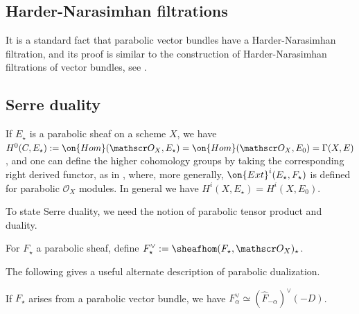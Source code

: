 \subsection{Harder-Narasimhan filtrations}
\label{subsubsection:harder-narasimhan-parabolic}
It is a standard fact that parabolic vector bundles have a Harder-Narasimhan
filtration, and its proof is similar to the construction of Harder-Narasimhan
filtrations of vector bundles, see
\cite[Part 3, \S1.B, Theorem 8]{seshadri:fibres-vectoriels-sur-les-courbes-algebriques}.

\subsection{Serre duality}

If $E_\star$ is a parabolic sheaf on a scheme
$X$, we have $H^0(C, E_\star) := \on{Hom}(\mathscr O_X, E_\star) =
\on{Hom}(\mathscr O_X, E_0) = \Gamma(X, E)$, and one can define the
higher cohomology groups by taking the corresponding right derived functor, as in
\cite[p. 130]{yokogawa:infinitesimal-deformation}, where, more generally,
$\on{Ext}^i(E_\star, F_\star)$ is defined for parabolic $\mathscr O_X$ modules.
In general we have $H^i(X, E_\star)=H^i(X, E_0)$.

To state Serre duality, we need the notion of parabolic tensor product and
duality.
\begin{definition}
\notready
	\label{definition:dualization}
	For $F_\star$ a parabolic sheaf, define $F^\vee_\star :=
	\sheafhom(F_\star, \mathscr O_X)_\star$.
\end{definition}
The following gives a useful alternate description of parabolic dualization.
\begin{lemma}
\notready
	\label{lemma:parabolic-dual-formula}
	If $F_\star$ arises from a parabolic vector bundle, we have
	$F^\vee_\alpha \simeq (\widehat{F}_{-\alpha})^\vee (-D)$.
\end{lemma}

